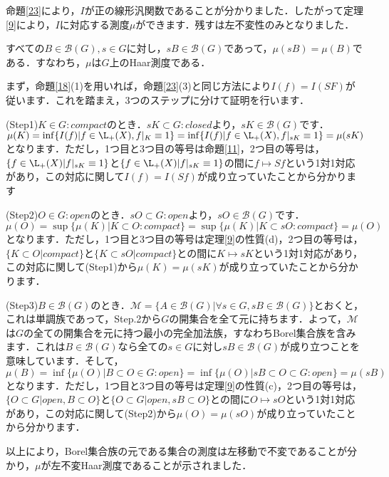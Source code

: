 命題\ref{23}により，$I$が正の線形汎関数であることが分かりました．したがって定理\ref{9}により，$I$に対応する測度$\mu$ができます．残すは左不変性のみとなりました．

\begin{prop}\label{25}
すべての$B \in \mathscr{B}(G), s \in G$に対し，$sB \in \mathscr{B}(G)$であって，$\mu(sB)=\mu(B)$である．すなわち，$\mu$は$G$上のHaar測度である．
\end{prop}
\begin{Proof}
まず，命題\ref{18}(1)を用いれば，命題\ref{23}(3)と同じ方法により$I(f)=I(SF)$が従います．これを踏まえ，3つのステップに分けて証明を行います．

(Step1)$K \in G \colon compact$のとき．$sK \subset G \colon closed$より，$sK \in  \mathscr{B}(G)$です．$\mu(K)= \inf \{ I(f) | f \in \L_{+}(X), f|_{K} \equiv 1 \}=\inf \{ I(f) | f \in \L_{+}(X), f|_{sK} \equiv 1 \}=\mu(sK)$となります．ただし，1つ目と3つ目の等号は命題\ref{11}，2つ目の等号は，$\{ f \in \L_{+}(X) | f|_{sK} \equiv 1 \}$と$\{ f \in \L_{+}(X) | f|_{sK} \equiv 1 \}$の間に$f \mapsto Sf$という1対1対応があり，この対応に関して$I(f)=I(Sf)$が成り立っていたことから分かります

(Step2)$O \in G \colon open$のとき．$sO \subset G \colon open$より，$sO \in \mathscr{B}(G)$です．$\mu(O)= \sup \{ \mu(K) | K \subset O \colon compact \}=\sup \{ \mu(K) | K \subset sO \colon compact \} = \mu (O)$となります．ただし，1つ目と3つ目の等号は定理\ref{9}の性質(d)，2つ目の等号は，$\{ K \subset O | compact \}$と$\{ K \subset sO | compact \}$との間に$K \mapsto sK$という1対1対応があり，この対応に関して(Step1)から$\mu(K)=\mu(sK)$が成り立っていたことから分かります．

(Step3)$B \in \mathscr{B}(G)$のとき．$\mathscr{M}=\{A \in \mathscr{B}(G) | \forall s \in G , sB \in \mathscr{B}(G) \}$とおくと，これは単調族であって，Step.2から$G$の開集合を全て元に持ちます．よって，$\mathscr{M}$は$G$の全ての開集合を元に持つ最小の完全加法族，すなわちBorel集合族を含みます．これは$B \in \mathscr{B}(G)$なら全ての$s \in G$に対し$ sB \in \mathscr{B}(G)$が成り立つことを意味しています．そして，$\mu(B)= \inf \{ \mu(O) | B \subset O \in G \colon open\}= \inf \{ \mu(O) | sB \subset O \subset G \colon open\} = \mu(sB)$となります．ただし，1つ目と3つ目の等号は定理\ref{9}の性質(c)，2つ目の等号は，$\{ O \subset G | open, B \subset O \}$と$\{ O \subset G | open, sB \subset O \}$との間に$O \mapsto sO$という1対1対応があり，この対応に関して(Step2)から$\mu(O)=\mu(sO)$が成り立っていたことから分かります．

以上により，Borel集合族の元である集合の測度は左移動で不変であることが分かり，$\mu$が左不変Haar測度であることが示されました．　
\end{Proof}
